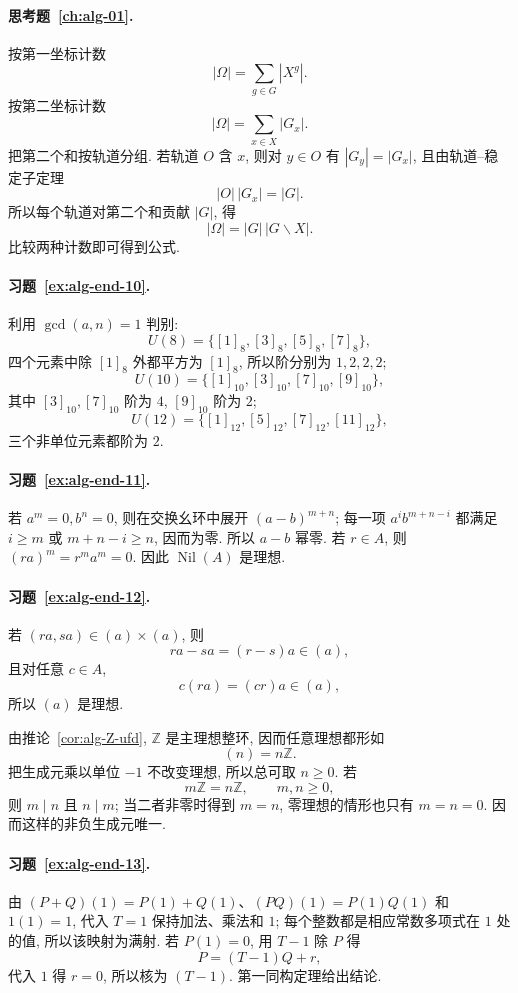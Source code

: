 \documentclass[usesamecnt, thmcnt=section, lang=cn, newtx, 10pt, scheme=chinese]{elegantbook}
\begin{document}
\paragraph*{思考题~\ref{ch:alg-01}.}
按第一坐标计数
\[
 |\Omega|=\sum_{g\in G}|X^g|.
\]
按第二坐标计数
\[
 |\Omega|=\sum_{x\in X}|G_x|.
\]
把第二个和按轨道分组. 若轨道 $O$ 含 $x$, 则对 $y\in O$ 有 $|G_y|=|G_x|$, 且由轨道--稳定子定理
\[
 |O|\,|G_x|=|G|.
\]
所以每个轨道对第二个和贡献 $|G|$, 得
\[
 |\Omega|=|G|\,|G\backslash X|.
\]
比较两种计数即可得到公式.

\paragraph*{习题~\ref{ex:alg-end-10}.}
利用 $\gcd(a,n)=1$ 判别:
\[
 U(8)=\{[1]_8,[3]_8,[5]_8,[7]_8\},
\]
四个元素中除 $[1]_8$ 外都平方为 $[1]_8$, 所以阶分别为 $1,2,2,2$;
\[
 U(10)=\{[1]_{10},[3]_{10},[7]_{10},[9]_{10}\},
\]
其中 $[3]_{10},[7]_{10}$ 阶为 $4$, $[9]_{10}$ 阶为 $2$;
\[
 U(12)=\{[1]_{12},[5]_{12},[7]_{12},[11]_{12}\},
\]
三个非单位元素都阶为 $2$.

\paragraph*{习题~\ref{ex:alg-end-11}.}
若 $a^m=0,b^n=0$, 则在交换幺环中展开 $(a-b)^{m+n}$; 每一项 $a^ib^{m+n-i}$ 都满足 $i\geq m$ 或 $m+n-i\geq n$, 因而为零. 所以 $a-b$ 幂零. 若 $r\in A$, 则 $(ra)^m=r^ma^m=0$. 因此 $\operatorname{Nil}(A)$ 是理想.

\paragraph*{习题~\ref{ex:alg-end-12}.}
若 $(ra,sa)\in(a)\times(a)$, 则
\[
 ra-sa=(r-s)a\in(a),
\]
且对任意 $c\in A$,
\[
 c(ra)=(cr)a\in(a),
\]
所以 $(a)$ 是理想.

由推论~\ref{cor:alg-Z-ufd}, $\mathbb Z$ 是主理想整环, 因而任意理想都形如
\[
 (n)=n\mathbb Z.
\]
把生成元乘以单位 $-1$ 不改变理想, 所以总可取 $n\geq0$. 若
\[
 m\mathbb Z=n\mathbb Z,\qquad m,n\geq0,
\]
则 $m\mid n$ 且 $n\mid m$; 当二者非零时得到 $m=n$, 零理想的情形也只有 $m=n=0$. 因而这样的非负生成元唯一.

\paragraph*{习题~\ref{ex:alg-end-13}.}
由 $(P+Q)(1)=P(1)+Q(1)$、$(PQ)(1)=P(1)Q(1)$ 和 $1(1)=1$, 代入 $T=1$ 保持加法、乘法和 $1$; 每个整数都是相应常数多项式在 $1$ 处的值, 所以该映射为满射. 若 $P(1)=0$, 用 $T-1$ 除 $P$ 得
\[
 P=(T-1)Q+r,
\]
代入 $1$ 得 $r=0$, 所以核为 $(T-1)$. 第一同构定理给出结论.
\end{document}
